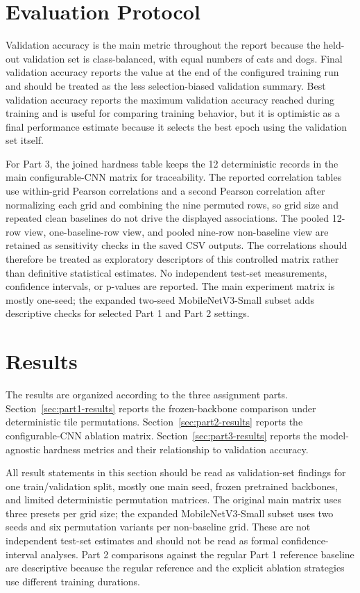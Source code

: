 \documentclass[12pt]{article}
\begin{document}
\section{Evaluation Protocol}

Validation accuracy is the main metric throughout the report because the held-out validation set is class-balanced, with equal numbers of cats and dogs. Final validation accuracy reports the value at the end of the configured training run and should be treated as the less selection-biased validation summary. Best validation accuracy reports the maximum validation accuracy reached during training and is useful for comparing training behavior, but it is optimistic as a final performance estimate because it selects the best epoch using the validation set itself.

For Part 3, the joined hardness table keeps the 12 deterministic records in the main configurable-CNN matrix for traceability. The reported correlation tables use within-grid Pearson correlations and a second Pearson correlation after normalizing each grid and combining the nine permuted rows, so grid size and repeated clean baselines do not drive the displayed associations. The pooled 12-row view, one-baseline-row view, and pooled nine-row non-baseline view are retained as sensitivity checks in the saved CSV outputs. The correlations should therefore be treated as exploratory descriptors of this controlled matrix rather than definitive statistical estimates. No independent test-set measurements, confidence intervals, or p-values are reported. The main experiment matrix is mostly one-seed; the expanded two-seed MobileNetV3-Small subset adds descriptive checks for selected Part 1 and Part 2 settings.

\section{Results}

The results are organized according to the three assignment parts. Section~\ref{sec:part1-results} reports the frozen-backbone comparison under deterministic tile permutations. Section~\ref{sec:part2-results} reports the configurable-CNN ablation matrix. Section~\ref{sec:part3-results} reports the model-agnostic hardness metrics and their relationship to validation accuracy.

All result statements in this section should be read as validation-set findings for one train/validation split, mostly one main seed, frozen pretrained backbones, and limited deterministic permutation matrices. The original main matrix uses three presets per grid size; the expanded MobileNetV3-Small subset uses two seeds and six permutation variants per non-baseline grid. These are not independent test-set estimates and should not be read as formal confidence-interval analyses. Part 2 comparisons against the regular Part 1 reference baseline are descriptive because the regular reference and the explicit ablation strategies use different training durations.
\end{document}
